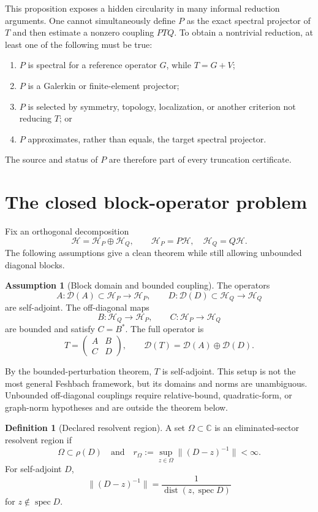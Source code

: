 \documentclass[11pt]{article}
\theoremstyle{definition}
\newtheorem{definition}[theorem]{Definition}
\newtheorem{assumption}[theorem]{Assumption}
\theoremstyle{remark}
\newcommand{\cD}{\mathcal D}
\newcommand{\cH}{\mathcal H}
\newcommand{\CC}{\mathbb C}
\newcommand{\1}{\mathbf 1}
\newcommand{\dist}{\operatorname{dist}}
\newcommand{\spec}{\operatorname{spec}}
\begin{document}
This proposition exposes a hidden circularity in many informal reduction
arguments.  One cannot simultaneously define \(P\) as the exact spectral
projector of \(T\) and then estimate a nonzero coupling \(PTQ\).  To obtain
a nontrivial reduction, at least one of the following must be true:
\begin{enumerate}[leftmargin=2em]
\item \(P\) is spectral for a reference operator \(G\), while
      \(T=G+V\);
\item \(P\) is a Galerkin or finite-element projector;
\item \(P\) is selected by symmetry, topology, localization, or another
      criterion not reducing \(T\); or
\item \(P\) approximates, rather than equals, the target spectral
      projector.
\end{enumerate}
The source and status of \(P\) are therefore part of every truncation
certificate.

\section{The closed block-operator problem}
\label{sec:blocks}

Fix an orthogonal decomposition
\[
  \cH=\cH_P\oplus\cH_Q,
  \qquad
  \cH_P=P\cH,\quad \cH_Q=Q\cH.
\]
The following assumptions give a clean theorem while still allowing
unbounded diagonal blocks.

\begin{assumption}[Block domain and bounded coupling]
\label{ass:block}
The operators
\[
 A:\cD(A)\subset\cH_P\to\cH_P,
 \qquad
 D:\cD(D)\subset\cH_Q\to\cH_Q
\]
are self-adjoint.  The off-diagonal maps
\[
 B:\cH_Q\to\cH_P,
 \qquad
 C:\cH_P\to\cH_Q
\]
are bounded and satisfy \(C=B^*\).  The full operator is
\[
 T=
 \begin{pmatrix}
 A&B\\ C&D
 \end{pmatrix},
 \qquad
 \cD(T)=\cD(A)\oplus\cD(D).
\]
\end{assumption}

By the bounded-perturbation theorem, \(T\) is self-adjoint.  This setup is
not the most general Feshbach framework, but its domains and norms are
unambiguous.  Unbounded off-diagonal couplings require relative-bound,
quadratic-form, or graph-norm hypotheses and are outside the theorem below.

\begin{definition}[Declared resolvent region]
A set \(\Omega\subset\CC\) is an eliminated-sector resolvent region if
\[
  \Omega\subset\rho(D)
  \quad\text{and}\quad
  r_\Omega:=
  \sup_{z\in\Omega}\|(D-z)^{-1}\|<\infty.
\]
For self-adjoint \(D\),
\[
  \|(D-z)^{-1}\|
  =
  \frac{1}{\dist(z,\spec D)}
\]
for \(z\notin\spec D\).
\end{definition}
\end{document}
